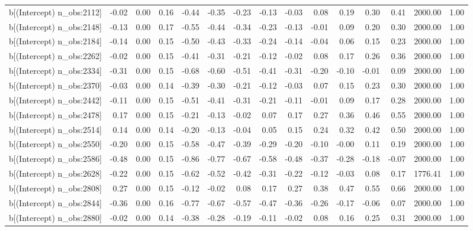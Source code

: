 \begin{table}[ht]
\begin{tabular}{rrrrrrrrrrrrrrr}
  b[(Intercept) n\_obs:2112] & -0.02 & 0.00 & 0.16 & -0.44 & -0.35 & -0.23 & -0.13 & -0.03 & 0.08 & 0.19 & 0.30 & 0.41 & 2000.00 & 1.00 \\ 
  b[(Intercept) n\_obs:2148] & -0.13 & 0.00 & 0.17 & -0.55 & -0.44 & -0.34 & -0.23 & -0.13 & -0.01 & 0.09 & 0.20 & 0.30 & 2000.00 & 1.00 \\ 
  b[(Intercept) n\_obs:2184] & -0.14 & 0.00 & 0.15 & -0.50 & -0.43 & -0.33 & -0.24 & -0.14 & -0.04 & 0.06 & 0.15 & 0.23 & 2000.00 & 1.00 \\ 
  b[(Intercept) n\_obs:2262] & -0.02 & 0.00 & 0.15 & -0.41 & -0.31 & -0.21 & -0.12 & -0.02 & 0.08 & 0.17 & 0.26 & 0.36 & 2000.00 & 1.00 \\ 
  b[(Intercept) n\_obs:2334] & -0.31 & 0.00 & 0.15 & -0.68 & -0.60 & -0.51 & -0.41 & -0.31 & -0.20 & -0.10 & -0.01 & 0.09 & 2000.00 & 1.00 \\ 
  b[(Intercept) n\_obs:2370] & -0.03 & 0.00 & 0.14 & -0.39 & -0.30 & -0.21 & -0.12 & -0.03 & 0.07 & 0.15 & 0.23 & 0.30 & 2000.00 & 1.00 \\ 
  b[(Intercept) n\_obs:2442] & -0.11 & 0.00 & 0.15 & -0.51 & -0.41 & -0.31 & -0.21 & -0.11 & -0.01 & 0.09 & 0.17 & 0.28 & 2000.00 & 1.00 \\ 
  b[(Intercept) n\_obs:2478] & 0.17 & 0.00 & 0.15 & -0.21 & -0.13 & -0.02 & 0.07 & 0.17 & 0.27 & 0.36 & 0.46 & 0.55 & 2000.00 & 1.00 \\ 
  b[(Intercept) n\_obs:2514] & 0.14 & 0.00 & 0.14 & -0.20 & -0.13 & -0.04 & 0.05 & 0.15 & 0.24 & 0.32 & 0.42 & 0.50 & 2000.00 & 1.00 \\ 
  b[(Intercept) n\_obs:2550] & -0.20 & 0.00 & 0.15 & -0.58 & -0.47 & -0.39 & -0.29 & -0.20 & -0.10 & -0.00 & 0.11 & 0.19 & 2000.00 & 1.00 \\ 
  b[(Intercept) n\_obs:2586] & -0.48 & 0.00 & 0.15 & -0.86 & -0.77 & -0.67 & -0.58 & -0.48 & -0.37 & -0.28 & -0.18 & -0.07 & 2000.00 & 1.00 \\ 
  b[(Intercept) n\_obs:2628] & -0.22 & 0.00 & 0.15 & -0.62 & -0.52 & -0.42 & -0.31 & -0.22 & -0.12 & -0.03 & 0.08 & 0.17 & 1776.41 & 1.00 \\ 
  b[(Intercept) n\_obs:2808] & 0.27 & 0.00 & 0.15 & -0.12 & -0.02 & 0.08 & 0.17 & 0.27 & 0.38 & 0.47 & 0.55 & 0.66 & 2000.00 & 1.00 \\ 
  b[(Intercept) n\_obs:2844] & -0.36 & 0.00 & 0.16 & -0.77 & -0.67 & -0.57 & -0.47 & -0.36 & -0.26 & -0.17 & -0.06 & 0.07 & 2000.00 & 1.00 \\ 
  b[(Intercept) n\_obs:2880] & -0.02 & 0.00 & 0.14 & -0.38 & -0.28 & -0.19 & -0.11 & -0.02 & 0.08 & 0.16 & 0.25 & 0.31 & 2000.00 & 1.00 \\ 

\end{tabular}
\end{table}
